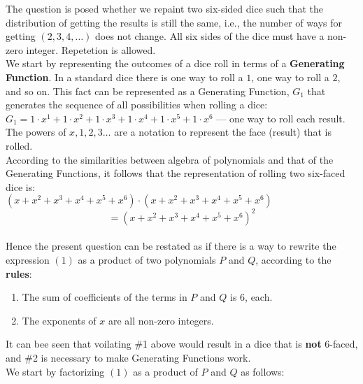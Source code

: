\documentclass{article}
\begin{document}
The question is posed whether we repaint two six-sided
dice such that the distribution of getting the results 
is still the same, i.e., the number of ways for getting 
$(2, 3, 4, \dots)$ does not change. All six sides of the
dice must have a non-zero integer. Repetetion is allowed.\\

We start by representing the outcomes of a dice roll
in terms of a \textbf{Generating Function}. 
In a standard dice there is one way to roll a $1$, 
one way to roll a $2$, and so on. This fact can be represented
as a Generating Function, $G_1$ that generates the sequence of
all possibilities when rolling a dice:\\

$G_1 = 1 \cdot x^1 + 1 \cdot x^2 + 1 \cdot x^3 + 1 \cdot x^4 + 1 \cdot x^5 + 1 \cdot x^6$
— one way to roll each result. The powers of $x, 1, 2, 3 \dots$
are a notation to represent the face (result) that is rolled.\\

According to the similarities between algebra of polynomials 
and that of the Generating Functions, it follows that the representation
of rolling two six-faced dice is:\\

$(x+x^2+x^3+x^4+x^5+x^6)\cdot(x+x^2+x^3+x^4+x^5+x^6)$\\

\begin{equation}
    =(x+x^2+x^3+x^4+x^5+x^6)^2
\end{equation}\\

Hence the present question can be restated as if there
is a way to rewrite the expression $(1)$ as a product of 
two polynomials $P$ and $Q$, according to the \textbf{rules}:
\begin{enumerate}
    \item The sum of coefficients of the terms in $P$ and $Q$ is $6$, each.
    \item The exponents of $x$ are all non-zero integers.\\
\end{enumerate}

It can bee seen that voilating \#1 above would result in a dice that
is \textbf{not} 6-faced, and \#2 is necessary to make
Generating Functions work.\\

We start by factorizing $(1)$ as
a product of $P$ and $Q$ as follows:\\
\end{document}
